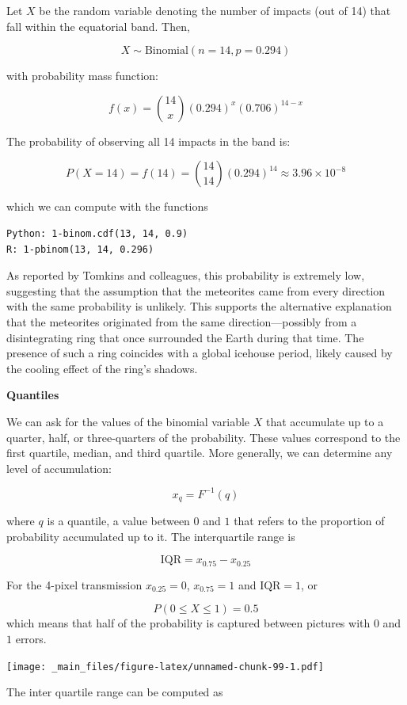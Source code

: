 \documentclass[
]{book}
\begin{document}
Let \(X\) be the random variable denoting the number of impacts (out of 14) that fall within the equatorial band. Then,

\[
X \sim \text{Binomial}(n=14, p=0.294)
\]

with probability mass function:

\[
f(x) = \binom{14}{x} (0.294)^x (0.706)^{14 - x}
\]

The probability of observing all 14 impacts in the band is:

\[
P(X = 14) = f(14) = \binom{14}{14} (0.294)^{14} \approx 3.96 \times 10^{-8}
\]

which we can compute with the functions

\begin{verbatim}
Python: 1-binom.cdf(13, 14, 0.9)
R: 1-pbinom(13, 14, 0.296)
\end{verbatim}

As reported by Tomkins and colleagues, this probability is extremely low, suggesting that the assumption that the meteorites came from every direction with the same probability is unlikely. This supports the alternative explanation that the meteorites originated from the same direction---possibly from a disintegrating ring that once surrounded the Earth during that time. The presence of such a ring coincides with a global icehouse period, likely caused by the cooling effect of the ring's shadows.

\textbf{Quantiles}

We can ask for the values of the binomial variable \(X\) that accumulate up to a quarter, half, or three-quarters of the probability. These values correspond to the first quartile, median, and third quartile. More generally, we can determine any level of accumulation:

\[x_q = F^{-1}(q)\]

where \(q\) is a quantile, a value between \(0\) and \(1\) that refers to the proportion of probability accumulated up to it. The interquartile range is

\[\text{IQR} = x_{0.75}-x_{0.25}\]

For the 4-pixel transmission \(x_{0.25}=0\), \(x_{0.75}=1\) and \(\text{IQR}=1\), or

\[P(0 \leq X \leq 1)=0.5\]
which means that half of the probability is captured between pictures with \(0\) and \(1\) errors.

\texttt{[image: \_main\_files/figure-latex/unnamed-chunk-99-1.pdf]}

The inter quartile range can be computed as
\end{document}
